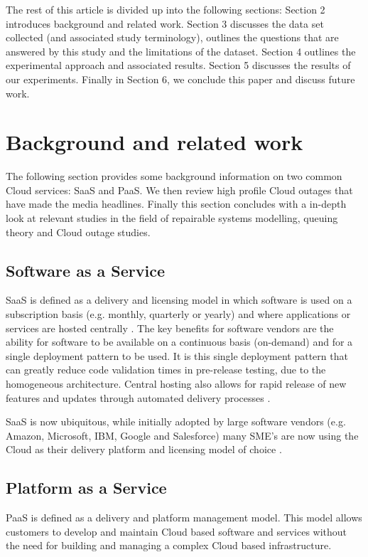 \documentclass[5p]{elsarticle}
\begin{document}
The rest of this article is divided up into the following sections: Section 2 introduces background and related work. Section 3 discusses the data set collected (and associated study terminology), outlines the questions that are answered by this study and the limitations of the dataset. Section 4 outlines the experimental approach and associated results. Section 5 discusses the results of our experiments. Finally in Section 6, we conclude this paper and discuss future work.

\section{Background and related work}

The following section provides some background information on two common Cloud services: SaaS and PaaS. We then review high profile Cloud outages that have made the media headlines. Finally this section concludes with a in-depth look at relevant studies in the field of repairable systems modelling, queuing theory and Cloud outage studies.

\subsection{Software as a Service}
SaaS is defined as a delivery and licensing model in which software is used on a subscription basis (e.g. monthly, quarterly or yearly) and where applications or services are hosted centrally \cite{Cloudbook2015}. The key benefits for software vendors are the ability for software to be available on a continuous basis (on-demand) and for a single deployment pattern to be used. It is this single deployment pattern that can greatly reduce code validation times in pre-release testing, due to the homogeneous architecture. Central hosting also allows for rapid release of new features and updates through automated delivery processes \cite{datacentre2015}. 

SaaS is now ubiquitous, while initially adopted by large software vendors (e.g. Amazon, Microsoft, IBM, Google and Salesforce) many SME's are now using the Cloud as their delivery platform and licensing model of choice \cite{CRN2015providers}. 

\subsection{Platform as a Service}
PaaS is defined as a delivery and platform management model. This model allows customers to develop and maintain Cloud based software and services without the need for building and managing a complex Cloud based infrastructure.
\end{document}
